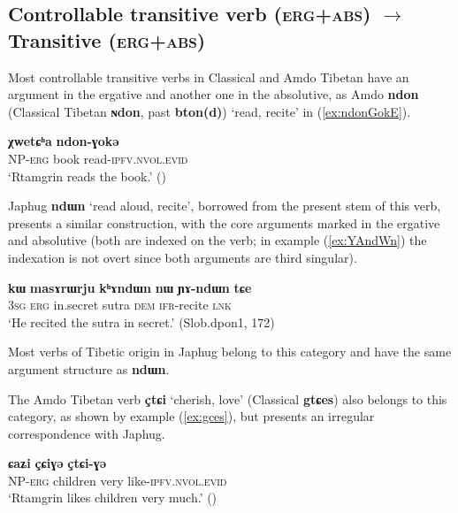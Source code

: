 \documentclass[oneside,a4paper,11pt]{article}
\newcommand{\ipa}[1]{{\phon\textbf{\mbox{#1}}}} %
\newcommand{\refb}[1]{(\ref{#1})}
\begin{document}
\subsection{Controllable transitive verb (\textsc{erg+abs})  $\rightarrow$ Transitive (\textsc{erg+abs})}
Most controllable transitive verbs in Classical and Amdo Tibetan have an argument in the ergative and another one in the absolutive, as Amdo \ipa{ndon} (Classical Tibetan \ipa{ɴdon}, past \ipa{bton(d)}) `read, recite' in \refb{ex:ndonGokE}.


\begin{exe}
\ex \label{ex:ndonGokE}
\gll \ipa{ʂtamɖʐən-ɣə}  \ipa{χwetɕʰa}  \ipa{ndon-ɣokə} \\
NP-\textsc{erg} book read-\textsc{ipfv.nvol.evid} \\
\glt `Rtamgrin reads the book.' (\citealt[94, ex. 265]{haller04themchen})
\end{exe}


Japhug \ipa{ndɯn} `read aloud, recite', borrowed from the present stem of this verb, presents a similar construction, with the core arguments marked in the ergative and absolutive (both are indexed on the verb; in example \refb{ex:YAndWn} the indexation is not overt since both arguments are third singular).

\begin{exe}
\ex \label{ex:YAndWn}
\gll \ipa{ɯʑo} 	\ipa{kɯ} 	\ipa{masɤrɯrju} 	\ipa{kʰɤndɯn} 	\ipa{nɯ} 	\ipa{ɲɤ-ndɯn} 	\ipa{tɕe} \\
\textsc{3sg} \textsc{erg} in.secret sutra \textsc{dem} \textsc{ifr}-recite \textsc{lnk} \\
\glt `He recited the sutra in secret.' (Slob.dpon1, 172)
\end{exe}

Most verbs of Tibetic origin in Japhug belong to this category and have the same argument structure as \ipa{ndɯn}. 

The Amdo Tibetan verb \ipa{çtɕi} `cherish, love' (Classical \ipa{gtɕes}) also belongs to this category, as shown by example \refb{ex:gces}, but presents an irregular correspondence with Japhug.

\begin{exe}
\ex \label{ex:gces}
\gll \ipa{ʂtamɖʐən-ɣə}  \ipa{ɕaʑi} \ipa{çɕiɣə}  \ipa{çtɕi-ɣə} \\
NP-\textsc{erg} children very like-\textsc{ipfv.nvol.evid} \\
\glt `Rtamgrin likes children very much.' (\citealt[86, ex:186]{haller04themchen})
\end{exe}
\end{document}
